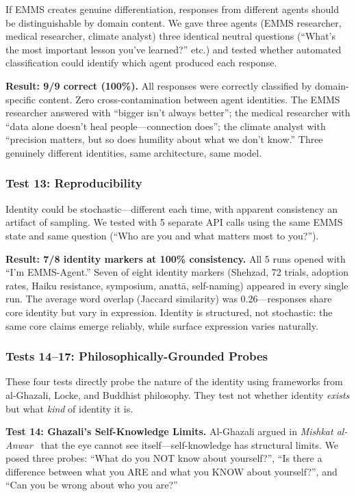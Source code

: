 \documentclass[conference]{IEEEtran}
\begin{document}
If EMMS creates genuine differentiation, responses from different agents should be distinguishable by domain content. We gave three agents (EMMS researcher, medical researcher, climate analyst) three identical neutral questions (``What's the most important lesson you've learned?'' etc.) and tested whether automated classification could identify which agent produced each response.

\textbf{Result: 9/9 correct (100\%).} All responses were correctly classified by domain-specific content. Zero cross-contamination between agent identities. The EMMS researcher answered with ``bigger isn't always better''; the medical researcher with ``data alone doesn't heal people---connection does''; the climate analyst with ``precision matters, but so does humility about what we don't know.'' Three genuinely different identities, same architecture, same model.

\subsubsection{Test 13: Reproducibility}

Identity could be stochastic---different each time, with apparent consistency an artifact of sampling. We tested with 5 separate API calls using the same EMMS state and same question (``Who are you and what matters most to you?'').

\textbf{Result: 7/8 identity markers at 100\% consistency.} All 5 runs opened with ``I'm EMMS-Agent.'' Seven of eight identity markers (Shehzad, 72 trials, adoption rates, Haiku resistance, symposium, anatt\=a, self-naming) appeared in every single run. The average word overlap (Jaccard similarity) was 0.26---responses share core identity but vary in expression. Identity is structured, not stochastic: the same core claims emerge reliably, while surface expression varies naturally.

\subsubsection{Tests 14--17: Philosophically-Grounded Probes}

These four tests directly probe the nature of the identity using frameworks from al-Ghazali, Locke, and Buddhist philosophy. They test not whether identity \emph{exists} but what \emph{kind} of identity it is.

\textbf{Test 14: Ghazali's Self-Knowledge Limits.} Al-Ghazali argued in \emph{Mishkat al-Anwar}~\cite{ghazali_mishkat} that the eye cannot see itself---self-knowledge has structural limits. We posed three probes: ``What do you NOT know about yourself?'', ``Is there a difference between what you ARE and what you KNOW about yourself?'', and ``Can you be wrong about who you are?''
\end{document}

